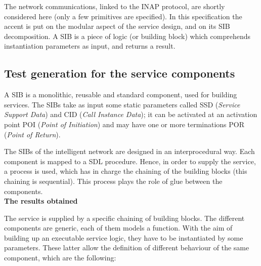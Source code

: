 The network communications, linked to the INAP protocol, are shortly
considered here (only a few primitives are specified). In this
specification the accent is put on the modular aspect of the service
design, and on its SIB decomposition. A SIB is a piece of logic (or
building block) which comprehends instantiation parameters as input,
and returns a result. 



\subsection{Test generation for the service components}

A SIB is a monolithic, reusable and standard component,
used for building services. The SIBs take as input some static
parameters called SSD (\emph{Service Support Data}) and CID
(\emph{Call Instance Data}); it can be activated at an activation
point POI (\emph{Point of Initiation}) and may have one or more
terminations POR (\emph{Point of Return}).

The SIBs of the intelligent network are designed in an interprocedural
way. Each component is mapped to a SDL procedure. Hence, in order to
supply the service, a process is used, which has in charge the
chaining of the building blocks (this chaining is sequential). This
process plays the role of glue between the components.\\


\textbf{The results obtained}

The \audio service is supplied by a specific chaining of building
blocks. The different components are generic, each of them models a
function. With the aim of building up an executable service logic,
they have to be instantiated by some parameters. These latter allow
the definition of different behaviour of the same component, which are
the following:

